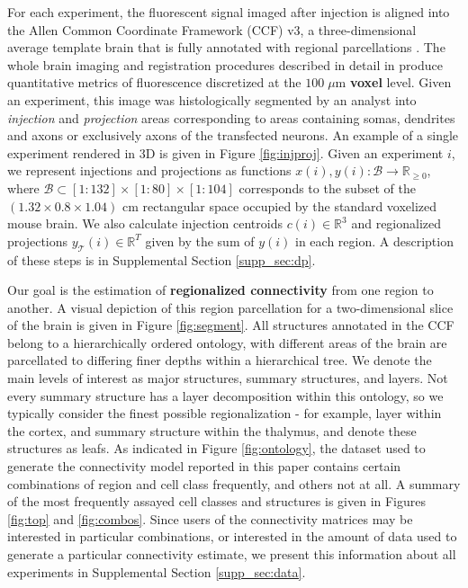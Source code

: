 For each experiment, the fluorescent signal imaged after injection is aligned into the Allen Common Coordinate Framework (CCF) v3, a three-dimensional average template brain that is fully annotated with regional parcellations \cite{Wang2020-po}.
The whole brain imaging and registration procedures described in detail in \citet{Oh2014-kh, Kuan2015-zz} produce quantitative metrics of fluorescence discretized at the $100 \; \mu$m \textbf{voxel} level. 
Given an experiment, this image was histologically segmented by an analyst into \textit{injection} and \textit{projection} areas corresponding to areas containing somas, dendrites and axons or exclusively axons of the transfected neurons.
An example of a single experiment rendered in 3D is given in Figure \ref{fig:injproj}.
Given an experiment $i$, we represent injections and projections as functions $x(i),y(i) : \mathcal B \to \mathbb R_{\geq 0}$, where $\mathcal B \subset [1:132] \times [1:80] \times [1:104]$ corresponds to the subset of the $(1.32 \times 0.8 \times 1.04)$ cm rectangular space occupied by the standard voxelized mouse brain.
We also calculate injection centroids $c(i) \in \mathbb R^3$ and regionalized projections $y_{\mathcal T} (i) \in \mathbb R^{T} $ given by the sum of $y(i)$ in each region.
A description of these steps is in Supplemental Section \ref{supp_sec:dp}.

Our goal is the estimation of \textbf{regionalized connectivity} from one region to another.
A visual depiction of this region parcellation for a two-dimensional slice of the brain is given in Figure \ref{fig:segment}.
All structures annotated in the CCF belong to a hierarchically ordered ontology, with different areas of the brain are parcellated to differing finer depths within a hierarchical tree.
We denote the main levels of interest as major structures, summary structures, and layers.
Not every summary structure has a layer decomposition within this ontology, so we typically consider the finest possible regionalization - for example, layer within the cortex, and summary structure within the thalymus, and denote these structures as leafs.
As indicated in Figure \ref{fig:ontology}, the dataset used to generate the connectivity model reported in this paper contains certain combinations of region and cell class frequently, and others not at all.
A summary of the most frequently assayed cell classes and structures is given in Figures \ref{fig:top} and \ref{fig:combos}.
Since users of the connectivity matrices may be interested in particular combinations, or interested in the amount of data used to generate a particular connectivity estimate, we present this information about all experiments in Supplemental Section \ref*{supp_sec:data}.

